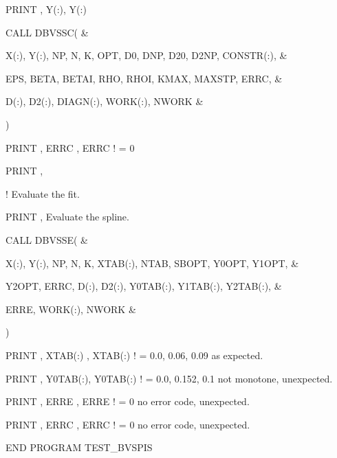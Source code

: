 {\item{}   \textCyan PRINT \textBlack *, Y(:){}\textBlack, Y(:)
\item{}   \textCyan CALL \textBlue DBVSSC\textBlack( \textCyan\&\textBlack $ $
\item{}   \hskip 10mm X(:), Y(:), NP, N, K, OPT, D0, DNP, D20, D2NP, CONSTR(:), \textCyan\&\textBlack $ $
\item{}   \hskip 10mm EPS, BETA, BETAI, RHO, RHOI, KMAX, MAXSTP, ERRC, \textCyan\&\textBlack $ $
\item{}   \hskip 10mm D(:), D2(:), DIAGN(:), WORK(:), NWORK \textCyan\&\textBlack $ $
\item{}   )
\item{}   \textCyan PRINT \textBlack *, ERRC {}\textBlack, ERRC \textMaroon ! = 0 \textBlack
\item{}   \textCyan PRINT \textBlack *, \textBlack
\item{}   \textMaroon ! Evaluate the fit. \textBlack
\item{}   \textCyan PRINT \textBlack *, Evaluate the spline.{}\textBlack
\item{}   \textCyan CALL \textBlue DBVSSE\textBlack( \textCyan\&\textBlack $ $
\item{}   \hskip 10mm X(:), Y(:), NP, N, K, XTAB(:), NTAB, SBOPT, Y0OPT, Y1OPT, \textCyan\&\textBlack $ $
\item{}   \hskip 10mm Y2OPT, ERRC, D(:), D2(:), Y0TAB(:), Y1TAB(:), Y2TAB(:), \textCyan\&\textBlack $ $
\item{}   \hskip 10mm ERRE, WORK(:), NWORK \textCyan\&\textBlack $ $
\item{}   )
\item{}   \textCyan PRINT \textBlack *, XTAB(:) {}\textBlack, XTAB(:) \textMaroon ! = 0.0, 0.06, 0.09 as expected.\textBlack
\item{}   \textCyan PRINT \textBlack *, Y0TAB(:){}\textBlack, Y0TAB(:) \textMaroon ! = 0.0, 0.152, 0.1 not monotone, unexpected.\textBlack
\item{}   \textCyan PRINT \textBlack *, ERRE {}\textBlack, ERRE \textMaroon ! = 0 no error code, unexpected.\textBlack
\item{}   \textCyan PRINT \textBlack *, ERRC {}\textBlack, ERRC \textMaroon ! = 0 no error code, unexpected.\textBlack
\item{} \textCyan END PROGRAM \textBlue TEST\_BVSPIS \textBlack

}
